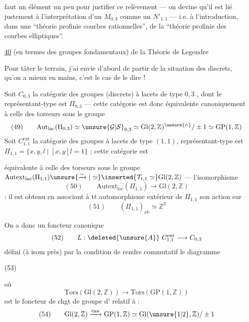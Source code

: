 
faut un élément un peu  pour justifier ce relèvement --- on
devine qu'il est lié justement à l'interprétation d'un $M_{0,3}$ comme
un $N'_{1,1}$ --- i.e. à l'introduction, dans une ``théorie profinie
 courbes rationnelles'', de la ``théorie profinie des
courbes elliptiques''.


\uline{40} 
(en termes des groupes fondamentaux) de la Théorie de Legendre

Pour tâter le terrain, j'ai envie d'abord de partir de la situation des
 discrets, qu'on a mieux en mains, c'est le cas de le dire !

Soit $C_{0,3}$ la catégorie des groupes (discrets) à lacets de type $0,3$
, dont le
représentant-type est $\Pi_{0,3}$ --- cette catégorie est donc
équivalente canoniquement à celle des torseurs sous le groupe
\[
(49)\qquad
\mathrm{Aut}_{\mathrm{lac}}(\Pi_{0,3})
\simeq\unsure{\mathcal G|\mathcal S}_{0,3}
\simeq\mathrm{Gl}(2,\mathbb Z)^{\unsure{\wedge}}/\pm1
\simeq\mathrm{GP}(1,\mathbb Z)
\]
Soit $C_{1,1}^{\mathrm{ext}}$ la catégorie des groupes à lacets
 de type $(1,1)$,
 représentant-type est
$\Pi_{1,1}=\{x,y,l\mid[x,y]l=1\}$ ; cette catégorie est


équivalente à celle des torseurs sous le groupe
$\mathrm{Autext}_{\mathrm{lac}}(\Pi_{1,1})
\unsure{\xrightarrow{\sim}|\simeq}
\inserted{\mathcal T_{1,1}\simeq}\mathrm{Gl}(2,\mathbb Z)$
--- l'isomorphisme
\[
(50)\qquad
\mathrm{Autext}_{\mathrm{lac}}(\Pi_{1,1})\longrightarrow
\mathrm{Gl}(2,\mathbb Z)
\]
: il est obtenu en associant à tt automorphisme extérieur de
$\Pi_{1,1}$ son action sur
\[
(51)\qquad
(\Pi_{1,1})_{\mathrm{ab}}\simeq\mathbb Z^2
\]

On a donc un foncteur canonique
\[
(52)\qquad
L:\deleted{\unsure{A}}\ C_{1,1}^{\mathrm{ext}}
\longrightarrow C_{0,3}
\]
défini (à isom  près) par la condition de rendre commutatif
le diagramme

(53)\quad
{}

où 
\[
\mathrm{Tors}(\mathrm{Gl}(2,\mathbb Z))\longrightarrow
\mathrm{Tors}(\mathrm{GP}(1,\mathbb Z))
\]
est le foncteur de chgt de groupe d' relatif à :
\[
(54)\qquad
\mathrm{Gl}(2,\mathbb Z)\xrightarrow{\mathrm{can}}
\mathrm{GP}(1,\mathbb Z)\simeq
\mathrm{Gl}(\unsure{1|2},\mathbb Z)/\pm1
\]


